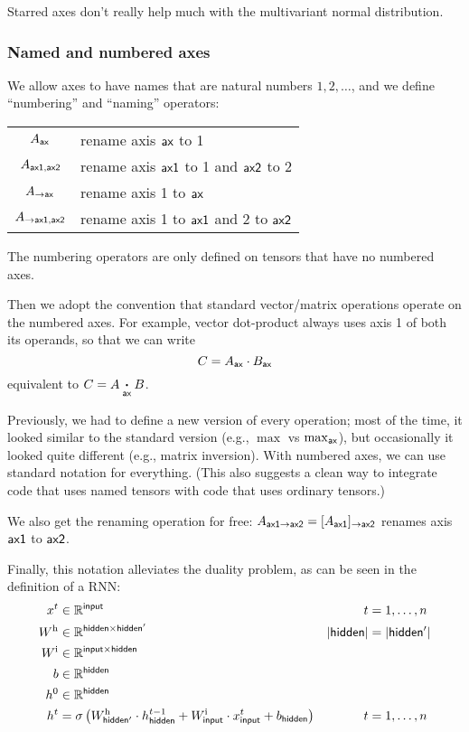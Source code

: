 Starred axes don't really help much with the multivariant normal distribution.

\subsubsection{Named and numbered axes}
\label{sec:tensorsoftensors}

We allow axes to have names that are natural numbers $1, 2, \ldots$, and we define ``numbering'' and ``naming'' operators:
\begin{center}
\begin{tabular}{cl}
$A_{\mathsf{ax}}$ & rename axis $\mathsf{ax}$ to 1 \\
$A_{\mathsf{ax1},\mathsf{ax2}}$ & rename axis $\mathsf{ax1}$ to 1 and $\mathsf{ax2}$ to 2 \\
$A_{\rightarrow\mathsf{ax}}$ & rename axis 1 to $\mathsf{ax}$ \\
$A_{\rightarrow\mathsf{ax1},\mathsf{ax2}}$ & rename axis 1 to $\mathsf{ax1}$ and 2 to $\mathsf{ax2}$
\end{tabular}
\end{center}
The numbering operators are only defined on tensors that have no numbered axes.

Then we adopt the convention that standard vector/matrix operations operate on the numbered axes. For example, vector dot-product always uses axis 1 of both its operands, so that we can write
\begin{equation*}
C = A_{\mathsf{ax}} \cdot B_{\mathsf{ax}}
\end{equation*}
equivalent to $C = A \mathbin{\mathop{\boldsymbol\cdot}\limits_{\mathsf{ax}}} B$. 

Previously, we had to define a new version of every operation; most of the time, it looked similar to the standard version (e.g., $\max$ vs $\max_{\mathsf{ax}}$), but occasionally it looked quite different (e.g., matrix inversion). With numbered axes, we can use standard notation for everything.
(This also suggests a clean way to integrate code that uses named tensors with code that uses ordinary tensors.)

We also get the renaming operation for free: $A_{\mathsf{ax1}\rightarrow\mathsf{ax2}} = [A_{\mathsf{ax1}}]_{\rightarrow\mathsf{ax2}}$ renames axis $\mathsf{ax1}$ to $\mathsf{ax2}$.

Finally, this notation alleviates the duality problem, as can be seen in the definition of a RNN:
\begin{align*}
x^{t} &\in \mathbb{R}^{\mathsf{input}} & t &= 1, \ldots, n \\
W^{\text{h}} &\in \mathbb{R}^{\mathsf{hidden} \times \mathsf{hidden'}} & |\mathsf{hidden}| &= |\mathsf{hidden'}| \\
W^{\text{i}} &\in \mathbb{R}^{\mathsf{input} \times \mathsf{hidden}} \\
b &\in \mathbb{R}^{\mathsf{hidden}} \\
h^{0} &\in \mathbb{R}^{\mathsf{hidden}} \\
h^{t} &= \sigma\left( W^{\text{h}}_{\mathsf{hidden'}} \cdot h^{t-1}_{\mathsf{hidden}} + W^{\text{i}}_{\mathsf{input}} \cdot x^{t}_{\mathsf{input}} + b_{\mathsf{hidden}} \right) & t &= 1, \ldots, n
\end{align*}

